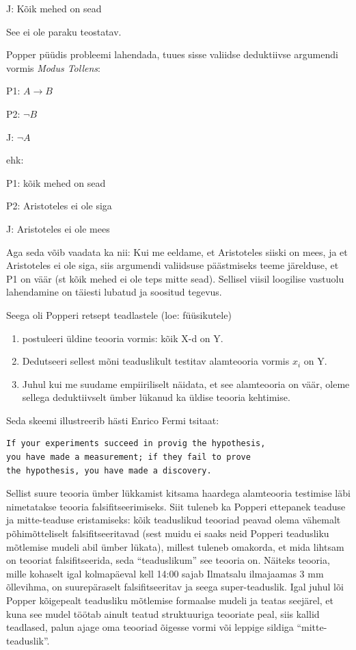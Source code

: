 \documentclass[]{book}
\begin{document}
J: Kõik mehed on sead

See ei ole paraku teostatav.

Popper püüdis probleemi lahendada, tuues sisse valiidse deduktiivse
argumendi vormis \emph{Modus Tollens}:

P1: \(A \rightarrow B\)

P2: \(\neg B\)

J: \(\neg A\)

ehk:

P1: kõik mehed on sead

P2: Aristoteles ei ole siga

J: Aristoteles ei ole mees

Aga seda võib vaadata ka nii: Kui me eeldame, et Aristoteles siiski on
mees, ja et Aristoteles ei ole siga, siis argumendi valiidsuse
päästmiseks teeme järelduse, et P1 on väär (st kõik mehed ei ole teps
mitte sead). Sellisel viisil loogilise vastuolu lahendamine on täiesti
lubatud ja soositud tegevus.

Seega oli Popperi retsept teadlastele (loe: füüsikutele)

\begin{enumerate}
\def\labelenumi{\arabic{enumi}.}
\item
  postuleeri üldine teooria vormis: kõik X-d on Y.
\item
  Dedutseeri sellest mõni teaduslikult testitav alamteooria vormis
  \(x_i\) on Y.
\item
  Juhul kui me suudame empiiriliselt näidata, et see alamteooria on
  väär, oleme sellega deduktiivselt ümber lükanud ka üldise teooria
  kehtimise.
\end{enumerate}

Seda skeemi illustreerib hästi Enrico Fermi tsitaat:

\begin{verbatim}
If your experiments succeed in provig the hypothesis, 
you have made a measurement; if they fail to prove 
the hypothesis, you have made a discovery.
\end{verbatim}

Sellist suure teooria ümber lükkamist kitsama haardega alamteooria
testimise läbi nimetatakse teooria falsifitseerimiseks. Siit tuleneb ka
Popperi ettepanek teaduse ja mitte-teaduse eristamiseks: kõik
teaduslikud teooriad peavad olema vähemalt põhimõtteliselt
falsifitseeritavad (sest muidu ei saaks neid Popperi teadusliku
mõtlemise mudeli abil ümber lükata), millest tuleneb omakorda, et mida
lihtsam on teooriat falsifitseerida, seda ``teaduslikum'' see teooria
on. Näiteks teooria, mille kohaselt igal kolmapäeval kell 14:00 sajab
Ilmatsalu ilmajaamas 3 mm õllevihma, on suurepäraselt falsifitseeritav
ja seega super-teaduslik. Igal juhul lõi Popper kõigepealt teadusliku
mõtlemise formaalse mudeli ja teatas seejärel, et kuna see mudel töötab
ainult teatud struktuuriga teooriate peal, siis kallid teadlased, palun
ajage oma teooriad õigesse vormi või leppige sildiga
``mitte-teaduslik''.
\end{document}
